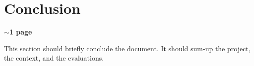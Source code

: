 
\section*{Conclusion }
\textbf{$\sim$1 page }


This section should briefly conclude the document. It should sum-up the project, the context, and the evaluations.

\pagebreak